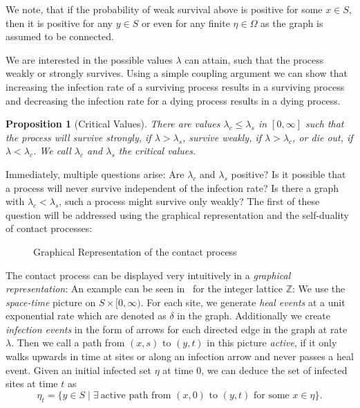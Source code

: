 \documentclass[a4paper,11pt]{amsart}
\theoremstyle{theorem}
\newtheorem{proposition}[theorem]{Proposition}
\theoremstyle{definition}
\newcommand{\Z}{\mathbb{Z}}
\begin{document}
We note, that if the probability of weak survival above is positive for some $x\in S$, then it is positive for any $y\in S$ or even for any finite $\eta \in \Omega$ as the graph is assumed to be connected.

We are interested in the possible values $\lambda$ can attain, such that the process weakly or strongly survives.
Using a simple coupling argument we can show that increasing the infection rate of a surviving process results in a surviving process and decreasing the infection rate for a dying process results in a dying process.

\begin{proposition}[Critical Values]
	There are values $\lambda_c \leq \lambda_s$ in $[0,\infty]$ such that the process will survive strongly, if $\lambda > \lambda_s$, survive weakly, if $\lambda > \lambda_c$, or die out, if $\lambda < \lambda_c$.
	We call $\lambda_c$ and $\lambda_s$ the \emph{critical values}.
\end{proposition}


Immediately, multiple questions arise:
Are $\lambda_c$ and $\lambda_s$ positive? Is it possible that a process will never survive independent of the infection rate?
Is there a graph with $\lambda_c < \lambda_s$, such a process might survive only weakly?
The first of these question will be addressed using the graphical representation and the self-duality of contact processes:

\begin{figure}[h]

\caption{Graphical Representation of the contact process}
\label{fig:graphical-rep}
\end{figure}

The contact process can be displayed very intuitively in a \emph{graphical representation}:
An example can be seen in~ for the integer lattice $\Z$:
We use the \emph{space-time} picture on $S\times [0,\infty)$. For each site, we generate \emph{heal events} at a unit exponential rate which are denoted as $\delta$ in the graph.
Additionally we create \emph{infection events} in the form of arrows for each directed edge in the graph at rate $\lambda$.
Then we call a path from $(x,s)$ to $(y,t)$ in this picture \emph{active}, if it only walks upwards in time at sites or along an infection arrow and never passes a heal event.
Given an initial infected set $\eta$ at time $0$, we can deduce the set of infected sites at time $t$ as $$\eta_t = \{y\in S\mid \exists\ \text{active path from $(x,0)$ to $(y,t)$ for some $x\in\eta$}\}.$$
\end{document}

